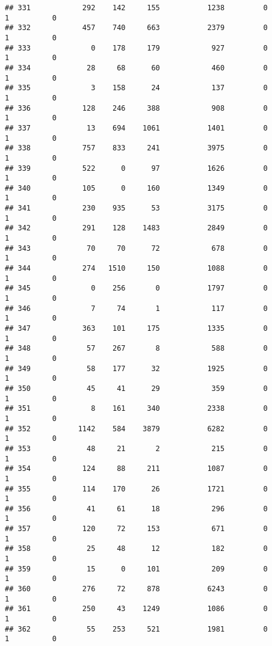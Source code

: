 \documentclass[
]{article}
\begin{document}
\begin{verbatim}
## 331            292    142     155           1238         0         1          0
## 332            457    740     663           2379         0         1          0
## 333              0    178     179            927         0         1          0
## 334             28     68      60            460         0         1          0
## 335              3    158      24            137         0         1          0
## 336            128    246     388            908         0         1          0
## 337             13    694    1061           1401         0         1          0
## 338            757    833     241           3975         0         1          0
## 339            522      0      97           1626         0         1          0
## 340            105      0     160           1349         0         1          0
## 341            230    935      53           3175         0         1          0
## 342            291    128    1483           2849         0         1          0
## 343             70     70      72            678         0         1          0
## 344            274   1510     150           1088         0         1          0
## 345              0    256       0           1797         0         1          0
## 346              7     74       1            117         0         1          0
## 347            363    101     175           1335         0         1          0
## 348             57    267       8            588         0         1          0
## 349             58    177      32           1925         0         1          0
## 350             45     41      29            359         0         1          0
## 351              8    161     340           2338         0         1          0
## 352           1142    584    3879           6282         0         1          0
## 353             48     21       2            215         0         1          0
## 354            124     88     211           1087         0         1          0
## 355            114    170      26           1721         0         1          0
## 356             41     61      18            296         0         1          0
## 357            120     72     153            671         0         1          0
## 358             25     48      12            182         0         1          0
## 359             15      0     101            209         0         1          0
## 360            276     72     878           6243         0         1          0
## 361            250     43    1249           1086         0         1          0
## 362             55    253     521           1981         0         1          0

\end{verbatim}
\end{document}
